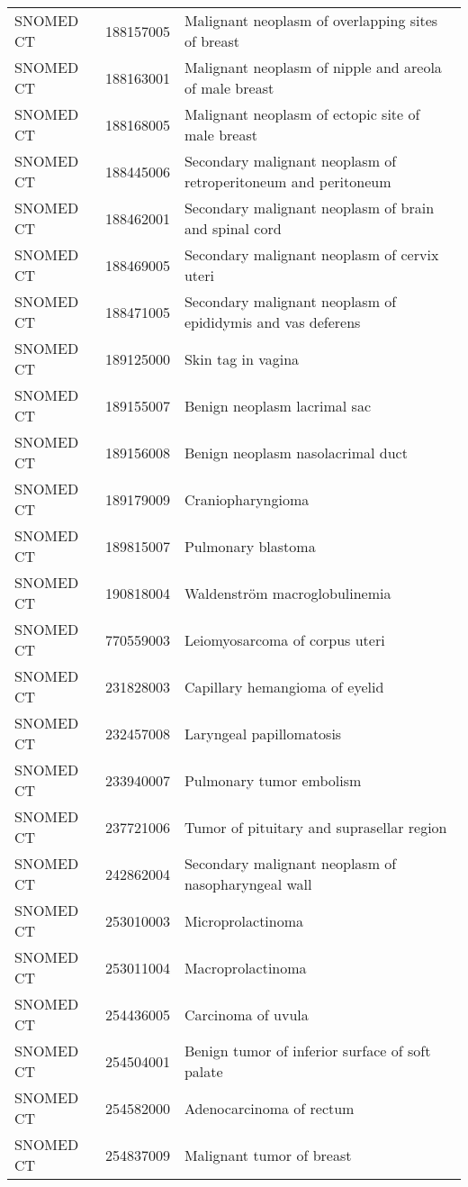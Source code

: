 \begin{longtable}{p{}p{}p{}}
  SNOMED CT & 188157005 & Malignant neoplasm of overlapping sites of breast \\ 
  SNOMED CT & 188163001 & Malignant neoplasm of nipple and areola of male breast \\ 
  SNOMED CT & 188168005 & Malignant neoplasm of ectopic site of male breast \\ 
  SNOMED CT & 188445006 & Secondary malignant neoplasm of retroperitoneum and peritoneum \\ 
  SNOMED CT & 188462001 & Secondary malignant neoplasm of brain and spinal cord \\ 
  SNOMED CT & 188469005 & Secondary malignant neoplasm of cervix uteri \\ 
  SNOMED CT & 188471005 & Secondary malignant neoplasm of epididymis and vas deferens \\ 
  SNOMED CT & 189125000 & Skin tag in vagina \\ 
  SNOMED CT & 189155007 & Benign neoplasm lacrimal sac \\ 
  SNOMED CT & 189156008 & Benign neoplasm nasolacrimal duct \\ 
  SNOMED CT & 189179009 & Craniopharyngioma \\ 
  SNOMED CT & 189815007 & Pulmonary blastoma \\ 
  SNOMED CT & 190818004 & Waldenström macroglobulinemia \\ 
  SNOMED CT & 770559003 & Leiomyosarcoma of corpus uteri \\ 
  SNOMED CT & 231828003 & Capillary hemangioma of eyelid \\ 
  SNOMED CT & 232457008 & Laryngeal papillomatosis \\ 
  SNOMED CT & 233940007 & Pulmonary tumor embolism \\ 
  SNOMED CT & 237721006 & Tumor of pituitary and suprasellar region \\ 
  SNOMED CT & 242862004 & Secondary malignant neoplasm of nasopharyngeal wall \\ 
  SNOMED CT & 253010003 & Microprolactinoma \\ 
  SNOMED CT & 253011004 & Macroprolactinoma \\ 
  SNOMED CT & 254436005 & Carcinoma of uvula \\ 
  SNOMED CT & 254504001 & Benign tumor of inferior surface of soft palate \\ 
  SNOMED CT & 254582000 & Adenocarcinoma of rectum \\ 
  SNOMED CT & 254837009 & Malignant tumor of breast \\ 

\end{longtable}

